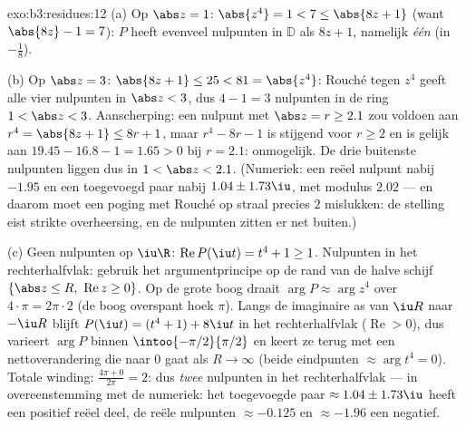 \begin{solution}{exo:b3:residues:12}
(a) Op $\abs z = 1$: $\abs{z^4} = 1 < 7 \leq \abs{8z + 1}$ (want
$\abs{8z} - 1 = 7$): $P$ heeft evenveel nulpunten in $\mathbb D$
als $8z + 1$, namelijk \emph{één} (in $-\frac18$).

(b) Op $\abs z = 3$: $\abs{8z + 1} \leq 25 < 81 = \abs{z^4}$:
Rouché tegen $z^4$ geeft alle vier nulpunten in $\abs z < 3$, dus
$4 - 1 = 3$ nulpunten in de ring $1 < \abs z < 3$. Aanscherping:
een nulpunt met $\abs z = r \geq 2.1$ zou voldoen aan $r^4 =
\abs{8z + 1} \leq 8r + 1$, maar $r^4 - 8r - 1$ is stijgend voor
$r \geq 2$ en is gelijk aan $19.45 - 16.8 - 1 = 1.65 > 0$ bij $r
= 2.1$: onmogelijk. De drie buitenste nulpunten liggen dus in $1
< \abs z < 2.1$. (Numeriek: een reëel nulpunt nabij $-1.95$ en
een toegevoegd paar nabij $1.04 \pm 1.73\iu$, met modulus $2.02$
--- en daarom moet een poging met Rouché op straal precies $2$
mislukken: de stelling eist strikte overheersing, en de nulpunten
zitten er net buiten.)

(c) Geen nulpunten op $\iu\R$: $\operatorname{Re}P(\iu t) = t^4 +
1 \geq 1$. Nulpunten in het rechterhalfvlak: gebruik het
argumentprincipe op de rand van de halve schijf $\{\abs z \leq
R,\ \operatorname{Re}z \geq 0\}$. Op de grote boog draait $\arg
P \approx \arg z^4$ over $4\cdot\pi = 2\pi\cdot2$ (de boog
overspant hoek $\pi$). Langs de imaginaire as van $\iu R$ naar
$-\iu R$ blijft $P(\iu t) = (t^4 + 1) + 8\iu t$ in het
rechterhalfvlak ($\operatorname{Re} > 0$), dus varieert $\arg P$
binnen $\intoo{-\pi/2}{\pi/2}$ en keert ze terug met een
nettoverandering die naar $0$ gaat als $R \to \infty$ (beide
eindpunten $\approx \arg t^4 = 0$). Totale winding: $\frac{4\pi +
0} {2\pi} = 2$: dus \emph{twee} nulpunten in het rechterhalfvlak
--- in overeenstemming met de numeriek: het toegevoegde paar
$\approx 1.04 \pm 1.73\iu$ heeft een positief reëel deel, de
reële nulpunten $\approx -0.125$ en $\approx -1.96$ een
negatief.
\end{solution}

